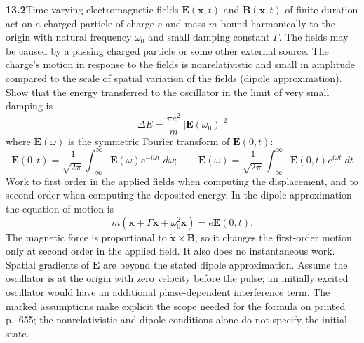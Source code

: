 \par\bigskip
\noindent\textbf{13.2}\quad Time-varying electromagnetic fields $\mathbf{E}(\mathbf{x},t)$ and $\mathbf{B}(\mathbf{x},t)$ of finite duration act on a charged particle of charge $e$ and mass $m$ bound harmonically to the origin with natural frequency $\omega_{0}$ and small damping constant $\Gamma$. The fields may be caused by a passing charged particle or some other external source. The charge's motion in response to the fields is nonrelativistic and small in amplitude compared to the scale of spatial variation of the fields (dipole approximation).  Show that the energy transferred to the oscillator in the limit of very small damping is
\[
\Delta E=\frac{\pi e^{2}}{m}\,|\mathbf{E}(\omega_{0})|^{2}
\]
where $\mathbf{E}(\omega)$ is the symmetric Fourier transform of $\mathbf{E}(0,t)$:
\[
\mathbf{E}(0,t)=\frac{1}{\sqrt{2\pi}}\int_{-\infty}^{\infty}\mathbf{E}(\omega)e^{-i\omega t}\;d\omega;\qquad
\mathbf{E}(\omega)=\frac{1}{\sqrt{2\pi}}\int_{-\infty}^{\infty}\mathbf{E}(0,t)e^{i\omega t}\;dt
\]
\solution
Work to first order in the applied fields when computing the displacement,
and to second order when computing the deposited energy. In the dipole
approximation the equation of motion is
\[
 m(\ddot{\mathbf x}+\Gamma\dot{\mathbf x}+\omega_0^2\mathbf x)
   =e\mathbf E(0,t).
\]
The magnetic force is proportional to $\dot{\mathbf x}\times\mathbf B$,
so it changes the first-order motion only at second order in the applied
field. It also does no instantaneous work. Spatial gradients of $\mathbf E$
are beyond the stated dipole approximation. Assume the oscillator is at
the origin with zero velocity before the pulse; an initially excited oscillator would have an
additional phase-dependent interference term. The marked assumptions make
explicit the scope needed for the formula on printed p.~655; the
nonrelativistic and dipole conditions alone do not specify the initial state.

